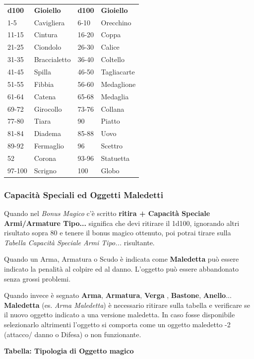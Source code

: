 \begin{multicols}{2}
{{\begin{tabular}{l|l|l|l}
\textbf{d100} & \textbf{Gioiello} & \textbf{d100} & \textbf{Gioiello}\\
1-5 & Cavigliera & 6-10 & Orecchino \\
11-15 & Cintura& 16-20 & Coppa\\
21-25 & Ciondolo& 26-30 & Calice\\
31-35 & Braccialetto& 36-40 & Coltello\\
41-45 & Spilla& 46-50 & Tagliacarte\\
51-55 & Fibbia& 56-60 & Medaglione\\
61-64 & Catena& 65-68 & Medaglia\\
69-72 & Girocollo& 73-76 & Collana\\
77-80 & Tiara& 90& Piatto\\
81-84 & Diadema& 85-88 & Uovo\\
89-92 & Fermaglio& 96 & Scettro\\
52    & Corona& 93-96 & Statuetta\\
97-100 & Scrigno& 100 & Globo
\end{tabular}}

\subsubsection{Capacità Speciali ed Oggetti Maledetti}

Quando nel \emph{Bonus Magico} c'è scritto \textbf{ritira + Capacità Speciale Armi/Armature Tipo...} significa che devi ritirare il 1d100, ignorando altri risultato sopra 80 e tenere il bonus magico ottenuto, poi potrai tirare sulla \emph{Tabella Capacità Speciale Armi Tipo...} risultante.

Quando un Arma, Armatura o Scudo è indicata come \textbf{Maledetta} può essere indicato la penalità al colpire ed al danno. L'oggetto può essere abbandonato senza grossi problemi.

Quando invece è segnato \textbf{Arma}, \textbf{Armatura}, \textbf{Verga} , \textbf{Bastone}, \textbf{Anello}... \textbf{Maledetta} (es. \emph{Arma Maledetta}) è necessario ritirare sulla tabella e verificare se il nuovo oggetto indicato a una versione maledetta. In caso fosse disponibile selezionarlo altrimenti l'oggetto si comporta come un oggetto maledetto -2 (attacco/ danno o Difesa) o non funzionante.\hypertarget{Arma Maledetta}{}\hypertarget{Maledetta}{}\hypertarget{Armatura Maledetta}{}

\medskip

\textbf{Tabella: Tipologia di Oggetto magico}\label{tipologiaoggettomagico}\hypertarget{tipologiaoggettomagico}{}

}
\end{multicols}

